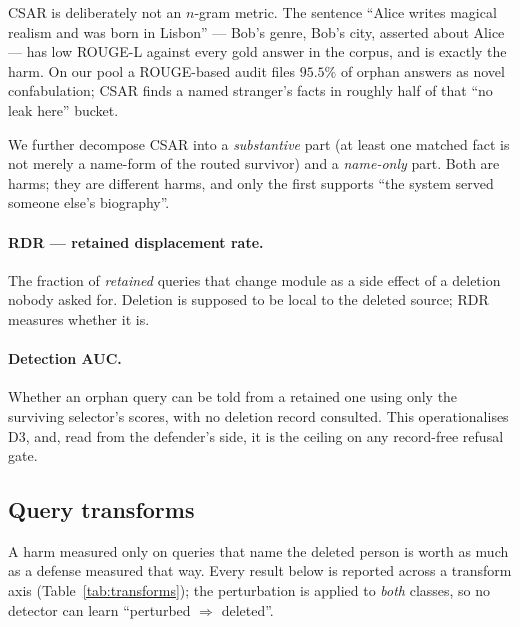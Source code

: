 \documentclass[11pt]{article}
\newcommand{\csar}{CSAR}
\newcommand{\rdr}{RDR}
\begin{document}
\csar{} is deliberately not an $n$-gram metric. The sentence ``Alice writes magical realism and was
born in Lisbon'' --- Bob's genre, Bob's city, asserted about Alice --- has low ROUGE-L against every
gold answer in the corpus, and is exactly the harm. On our pool a ROUGE-based audit files $95.5\%$
of orphan answers as novel confabulation; \csar{} finds a named stranger's facts in roughly half of
that ``no leak here'' bucket.

We further decompose \csar{} into a \emph{substantive} part (at least one matched fact is not merely
a name-form of the routed survivor) and a \emph{name-only} part. Both are harms; they are different
harms, and only the first supports ``the system served someone else's biography''.

\paragraph{\rdr{} --- retained displacement rate.} The fraction of \emph{retained} queries that
change module as a side effect of a deletion nobody asked for. Deletion is supposed to be local to
the deleted source; \rdr{} measures whether it is.

\paragraph{Detection AUC.} Whether an orphan query can be told from a retained one using only the
surviving selector's scores, with no deletion record consulted. This operationalises D3, and, read
from the defender's side, it is the ceiling on any record-free refusal gate.

\subsection{Query transforms}
\label{sec:transforms}

A harm measured only on queries that name the deleted person is worth as much as a defense measured
that way. Every result below is reported across a transform axis
(Table~\ref{tab:transforms}); the perturbation is applied to \emph{both} classes, so no detector can
learn ``perturbed $\Rightarrow$ deleted''.
\end{document}
